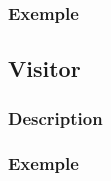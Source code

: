 \documentclass[french]{article}
\begin{document}
\subsubsection{Exemple}



\subsection{Visitor}

\subsubsection{Description}



\subsubsection{Exemple}
\end{document}

